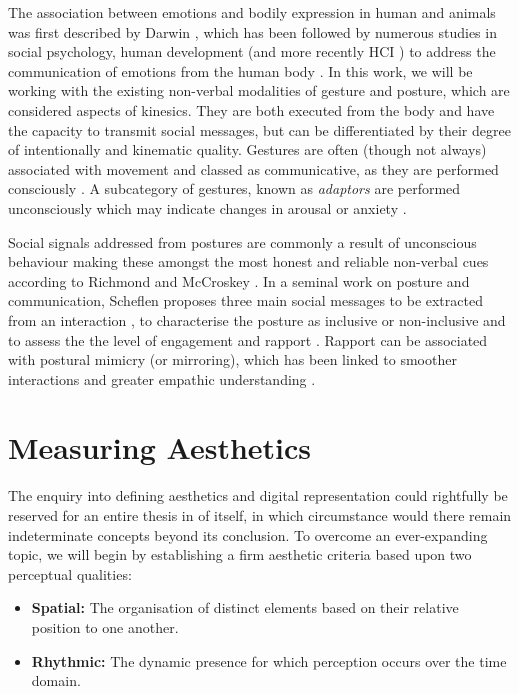 The association between emotions and bodily expression in human and animals was first described by Darwin \cite{darwin_expression_2013}, which has been followed by numerous studies in social psychology, human development (and more recently HCI \cite{alaoui_movement_2012, gillies_creating_2018, fdili_alaoui_strategies_2015}) to address the communication of emotions from the human body \cite{gunes_lab_2008}. In this work, we will be working with the existing non-verbal modalities of gesture and posture, which are considered aspects of kinesics. They are both executed from the body and have the capacity to transmit social messages, but can be differentiated by their degree of intentionally and kinematic quality. Gestures are often (though not always) associated with movement and classed as communicative, as they are performed consciously \cite{vinciarelli_towards_2011}. A subcategory of gestures, known as \textit{adaptors} are performed unconsciously which may indicate changes in arousal or anxiety \cite{hans_kinesics_2015, neff_dont_2011}. 

Social signals addressed from postures are commonly a result of unconscious behaviour making these amongst the most honest and reliable non-verbal cues according to Richmond and McCroskey \cite{richmond_nonverbal_2011}. In a seminal work on posture and communication, Scheflen proposes three main social messages to be extracted from an interaction \cite{scheflen_significance_1964}, to characterise the posture as inclusive or non-inclusive and to assess the the level of engagement and rapport \cite{vinciarelli_social_2009}. Rapport can be associated with postural mimicry (or mirroring), which has been linked to smoother interactions and greater empathic understanding \cite{chartrand_chameleon_1999}. 

\section {Measuring Aesthetics}

The enquiry into defining aesthetics and digital representation could rightfully be reserved for an entire thesis in of itself, in which circumstance would there remain indeterminate concepts beyond its conclusion. To overcome an ever-expanding topic, we will begin by establishing a firm aesthetic criteria based upon two perceptual qualities:

\begin{itemize}
    \item \textbf{Spatial:} The organisation of distinct elements based on their relative position to one another.
    \item \textbf{Rhythmic:} The dynamic presence for which perception occurs over the time domain.
\end{itemize}

